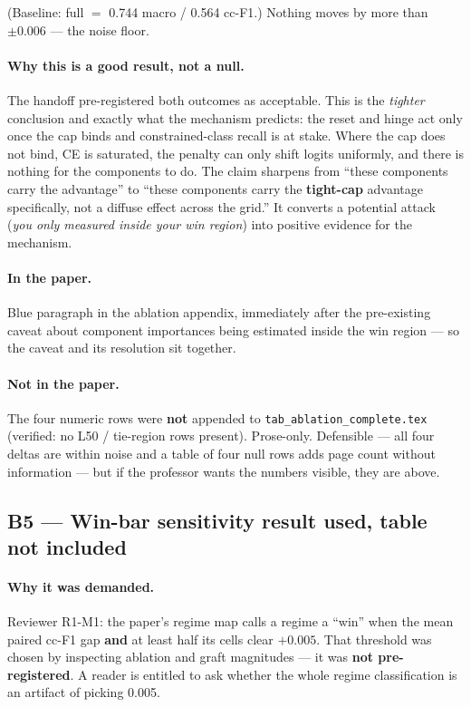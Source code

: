 \documentclass[11pt,a4paper]{article}
\begin{document}
(Baseline: full $=$ 0.744 macro / 0.564 cc-F1.) Nothing moves by more than $\pm0.006$ --- the noise
floor.

\paragraph{Why this is a good result, not a null.} The handoff pre-registered both outcomes as
acceptable. This is the \emph{tighter} conclusion and exactly what the mechanism predicts: the reset
and hinge act only once the cap binds and constrained-class recall is at stake. Where the cap does
not bind, CE is saturated, the penalty can only shift logits uniformly, and there is nothing for the
components to do. The claim sharpens from ``these components carry the advantage'' to ``these
components carry the \textbf{tight-cap} advantage specifically, not a diffuse effect across the
grid.'' It converts a potential attack (\emph{you only measured inside your win region}) into
positive evidence for the mechanism.

\paragraph{In the paper.} Blue paragraph in the ablation appendix, immediately after the
pre-existing caveat about component importances being estimated inside the win region --- so the
caveat and its resolution sit together.

\paragraph{Not in the paper.} The four numeric rows were \textbf{not} appended to
\texttt{tab\_ablation\_complete.tex} (verified: no L50 / tie-region rows present). Prose-only.
Defensible --- all four deltas are within noise and a table of four null rows adds page count
without information --- but if the professor wants the numbers visible, they are above.

\subsection*{B5 --- Win-bar sensitivity
\hfill\normalsize\textcolor{warnred}{\textbf{result used, table not included}}}

\paragraph{Why it was demanded.} Reviewer R1-M1: the paper's regime map calls a regime a ``win''
when the mean paired cc-F1 gap \textbf{and} at least half its cells clear $\mathbf{+0.005}$. That
threshold was chosen by inspecting ablation and graft magnitudes --- it was \textbf{not
pre-registered}. A reader is entitled to ask whether the whole regime classification is an artifact
of picking 0.005.
\end{document}
